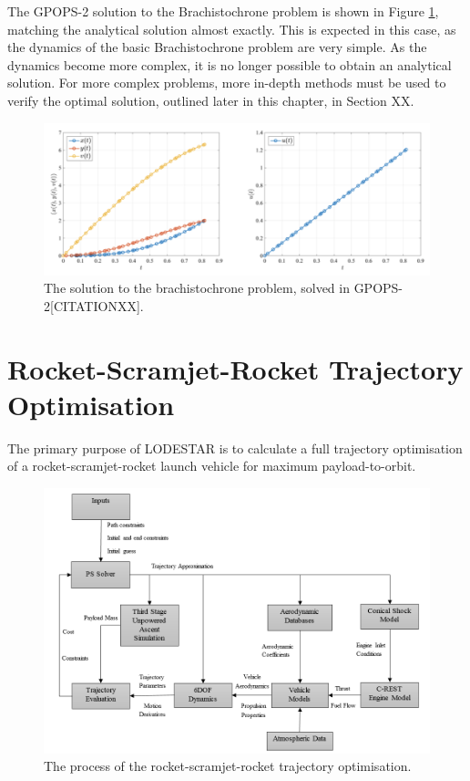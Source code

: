 The GPOPS-2 solution to the Brachistochrone problem is shown in Figure \ref{fig:Brachistochrone}, matching the analytical solution almost exactly. This is expected in this case, as the dynamics of the basic Brachistochrone problem are very simple. As the dynamics become more complex, it is no longer possible to obtain an analytical solution. For more complex problems, more in-depth methods must be used to verify the optimal solution, outlined later in this chapter, in Section XX.  

\begin{figure}[ht]
\centering
\includegraphics[width=0.9\linewidth]{figures/4_LODESTAR/Brachistochrone}
\caption{The solution to the brachistochrone problem, solved in GPOPS-2[CITATIONXX].}
\label{fig:Brachistochrone}
\end{figure}





\section{Rocket-Scramjet-Rocket Trajectory Optimisation}


The primary purpose of LODESTAR is to calculate a full trajectory optimisation of a rocket-scramjet-rocket launch vehicle for maximum payload-to-orbit. 




\begin{landscape}%
	\begin{figure}[ht]
		\centering
		\includegraphics[width=0.9\linewidth]{"figures/4_LODESTAR/Ascent Flowchart"}
		\caption{The process of the rocket-scramjet-rocket trajectory optimisation.}
		\label{fig:AscentFlowchart}
	\end{figure} 
\end{landscape}


